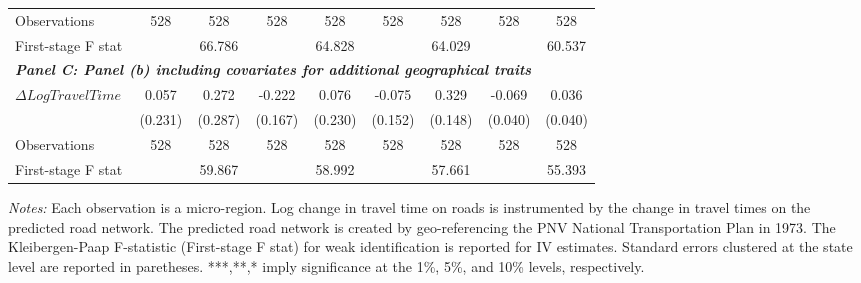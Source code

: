 \begin{table}[htbp]
{\begin{tabular}{l*{8}{c}}
Observations        &         528         &         528         &         528         &         528         &         528         &         528         &         528         &         528         \\
First-stage F stat  &                     &      66.786         &                     &      64.828         &                     &      64.029         &                     &      60.537         \\
\hline

\multicolumn{8}{l}{\linebreak \textbf{\textit{Panel C: Panel (b) including covariates for additional geographical traits}}} \\
$\Delta Log Travel Time$&       0.057         &       0.272         &      -0.222         &       0.076         &      -0.075         &       0.329\sym{**} &      -0.069         &       0.036         \\
&     (0.231)         &     (0.287)         &     (0.167)         &     (0.230)         &     (0.152)         &     (0.148)         &     (0.040)         &     (0.040)         \\

Observations        &         528         &         528         &         528         &         528         &         528         &         528         &         528         &         528         \\
First-stage F stat  &                     &      59.867         &                     &      58.992         &                     &      57.661         &                     &      55.393         \\
\hline\hline
\end{tabular}}
\endgroup
\begin{minipage}{\linewidth}
    \vspace{0.1cm}
    {\footnotesize \textit{Notes: }  Each observation is a micro-region. Log change in travel time on roads is instrumented by the change in travel times on the predicted road network. The predicted road network is created by geo-referencing the PNV National Transportation Plan in 1973. The Kleibergen-Paap F-statistic (First-stage F stat) for weak identification is reported for IV estimates. Standard errors clustered at the state level are reported in paretheses. ***,**,* imply significance at the 1\%, 5\%, and 10\% levels, respectively.}
\end{minipage}
\end{table}
